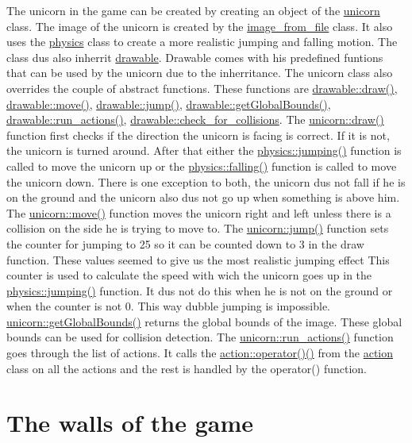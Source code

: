 The unicorn in the game can be created by creating an object of the \hyperlink{classunicorn}{unicorn} class. The image of the unicorn is created by the \hyperlink{classimage__from__file}{image\+\_\+from\+\_\+file} class. It also uses the \hyperlink{classphysics}{physics} class to create a more realistic jumping and falling motion. The class dus also inherrit \hyperlink{classdrawable}{drawable}. Drawable comes with his predefined funtions that can be used by the unicorn due to the inherritance. The unicorn class also overrides the couple of abstract functions. These functions are \hyperlink{classdrawable_a4e49e2c1121704c83ce24c5f48dd910f}{drawable\+::draw()}, \hyperlink{classdrawable_ad0d3930c045cc6776aa2c3965be32491}{drawable\+::move()}, \hyperlink{classdrawable_ac39691470b7874f5dec59efe649d3981}{drawable\+::jump()}, \hyperlink{classdrawable_ae013ac0be47538be9ce885d6642daf73}{drawable\+::get\+Global\+Bounds()}, \hyperlink{classdrawable_a715df01a318331e5611a2b0ad30109ff}{drawable\+::run\+\_\+actions()}, \hyperlink{classdrawable_abbc6e0089d502ba48c3fcb9c96e3966e}{drawable\+::check\+\_\+for\+\_\+collisions}. The \hyperlink{classunicorn_a570c34d5669a8d2a61bdc1481e6f9dee}{unicorn\+::draw()} function first checks if the direction the unicorn is facing is correct. If it is not, the unicorn is turned around. After that either the \hyperlink{classphysics_aaf1c57aa6e35b9c83ccbfdfa8c18468c}{physics\+::jumping()} function is called to move the unicorn up or the \hyperlink{classphysics_acca1ee2fb8b760b6e4ee61ae7c2ee3da}{physics\+::falling()} function is called to move the unicorn down. There is one exception to both, the unicorn dus not fall if he is on the ground and the unicorn also dus not go up when something is above him. The \hyperlink{classunicorn_a162f200a68342f7bc0baaf17c8cf3f9f}{unicorn\+::move()} function moves the unicorn right and left unless there is a collision on the side he is trying to move to. The \hyperlink{classunicorn_a07d5ca4e66632c0e871221a27146805a}{unicorn\+::jump()} function sets the counter for jumping to 25 so it can be counted down to 3 in the draw function. These values seemed to give us the most realistic jumping effect This counter is used to calculate the speed with wich the unicorn goes up in the \hyperlink{classphysics_aaf1c57aa6e35b9c83ccbfdfa8c18468c}{physics\+::jumping()} function. It dus not do this when he is not on the ground or when the counter is not 0. This way dubble jumping is impossible. \hyperlink{classunicorn_a1bac09fc59b04f14f5a093bc4daa04da}{unicorn\+::get\+Global\+Bounds()} returns the global bounds of the image. These global bounds can be used for collision detection. The \hyperlink{classunicorn_aadb47a9981c46d6add8704074df117df}{unicorn\+::run\+\_\+actions()} function goes through the list of actions. It calls the \hyperlink{classaction_ab4f8d0f7552450455977d09a889c18c7}{action\+::operator()()} from the \hyperlink{classaction}{action} class on all the actions and the rest is handled by the operator() function.\hypertarget{index_wall}{}\section{The walls of the game}\label{index_wall}

